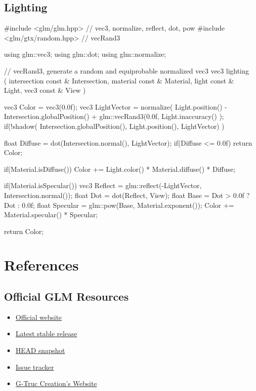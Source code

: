 \documentclass{scrartcl}
\numberwithin{figure}{subsection}
\begin{document}
\subsection{Lighting}

\begin{cppcode}
#include <glm/glm.hpp> // vec3, normalize, reflect, dot, pow
#include <glm/gtx/random.hpp> // vecRand3

using glm::vec3;
using glm::dot;
using glm::normalize;

// vecRand3, generate a random and equiprobable normalized vec3
vec3 lighting
(
  intersection const & Intersection,
  material const & Material,
  light const & Light,
  vec3 const & View
)
{
  vec3 Color = vec3(0.0f);
  vec3 LightVector = normalize(
    Light.position() - Intersection.globalPosition() +
    glm::vecRand3(0.0f, Light.inaccuracy()
  );
  if(!shadow(
    Intersection.globalPosition(), Light.position(), LightVector)
  )
  {
    float Diffuse = dot(Intersection.normal(), LightVector);
    if(Diffuse <= 0.0f)
      return Color;

    if(Material.isDiffuse())
      Color += Light.color() * Material.diffuse() * Diffuse;

    if(Material.isSpecular())
    {
      vec3 Reflect = glm::reflect(-LightVector, Intersection.normal());
      float Dot = dot(Reflect, View);
      float Base = Dot > 0.0f ? Dot : 0.0f;
      float Specular = glm::pow(Base, Material.exponent());
      Color += Material.specular() * Specular;
    }
  }
  return Color;
}
\end{cppcode}

\newpage{}

\section{References}

\subsection{Official GLM Resources}

\begin{itemize}
  \item \href{http://glm.g-truc.net}{Official website}
  \item \href{https://github.com/g-truc/glm/releases/tag/0.9.7.1}{Latest stable release}
  \item \href{https://github.com/g-truc/glm/archive/master.zip}{HEAD snapshot}
  \item \href{https://github.com/g-truc/glm/issues}{Issue tracker}
  \item \href{http://www.g-truc.net}{G-Truc Creation's Website}
\end{itemize}
\end{document}
